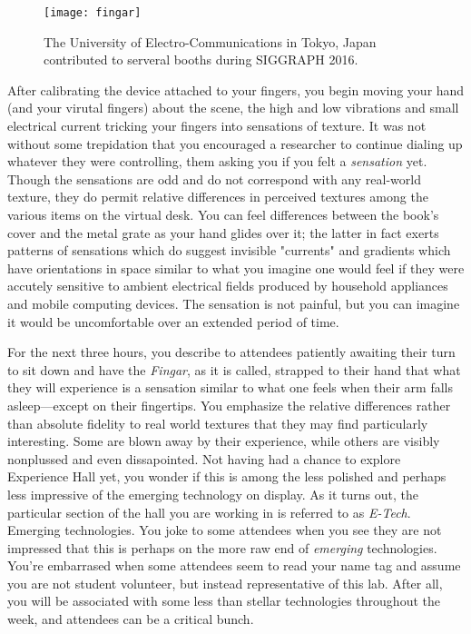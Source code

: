 \documentclass[../main.tex]{subfiles}
\begin{document}
\begin{figure}[h!]
	\centering
	\texttt{[image: fingar]}
	\caption*{The University of Electro-Communications in Tokyo, Japan contributed to serveral booths during SIGGRAPH 2016.}
\end{figure}

After calibrating the device attached to your fingers, you begin moving your hand (and your virutal fingers) about the scene, the high and low vibrations and small electrical current tricking your fingers into sensations of texture. It was not without some trepidation that you encouraged a researcher to continue dialing up whatever they were controlling, them asking you if you felt a \textit{sensation} yet. Though the sensations are odd and do not correspond with any real-world texture, they do permit relative differences in perceived textures among the various items on the virtual desk. You can feel differences between the book's cover and the metal grate as your hand glides over it; the latter in fact exerts patterns of sensations which do suggest invisible "currents" and gradients which have orientations in space similar to what you imagine one would feel if they were accutely sensitive to ambient electrical fields produced by household appliances and mobile computing devices. The sensation is not painful, but you can imagine it would be uncomfortable over an extended period of time.

For the next three hours, you describe to attendees patiently awaiting their turn to sit down and have the \textit{Fingar}, as it is called, strapped to their hand that what they will experience is a sensation similar to what one feels when their arm falls asleep---except on their fingertips. You emphasize the relative differences rather than absolute fidelity to real world textures that they may find particularly interesting. Some are blown away by their experience, while others are visibly nonplussed and even dissapointed. Not having had a chance to explore Experience Hall yet, you wonder if this is among the less polished and perhaps less impressive of the emerging technology on display. As it turns out, the particular section of the hall you are working in is referred to as \textit{E-Tech}. Emerging technologies. You joke to some attendees when you see they are not impressed that this is perhaps on the more raw end of \textit{emerging} technologies. You're embarrased when some attendees seem to read your name tag and assume you are not student volunteer, but instead representative of this lab. After all, you will be associated with some less than stellar technologies throughout the week, and attendees can be a critical bunch.
\end{document}
